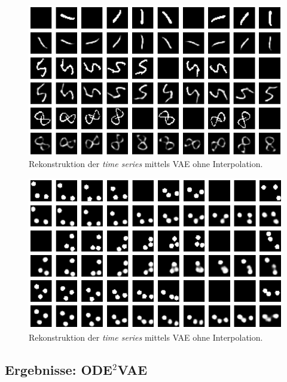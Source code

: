 \documentclass[12pt]{article}
\begin{document}
	\begin{figure}[!htbp]
		\centering
		\includegraphics[scale=0.8]{whole_sequence_mnist}
		\caption{Rekonstruktion der \emph{time series} mittels VAE ohne Interpolation.}
		\label{Abb:VAEohneInterpolMNIST}
	\end{figure}
	\begin{figure}[!htbp]
		\centering
		\includegraphics[scale=0.8]{whole_sequence_bouncingBalls}
		\caption{Rekonstruktion der \emph{time series} mittels VAE ohne Interpolation.}
		\label{Abb:VAEohneInterpolbouncingBalls}
	\end{figure}
	\newpage
	\subsection[ODE$^2$VAE]{Ergebnisse: ODE$^2$VAE}
\end{document}
